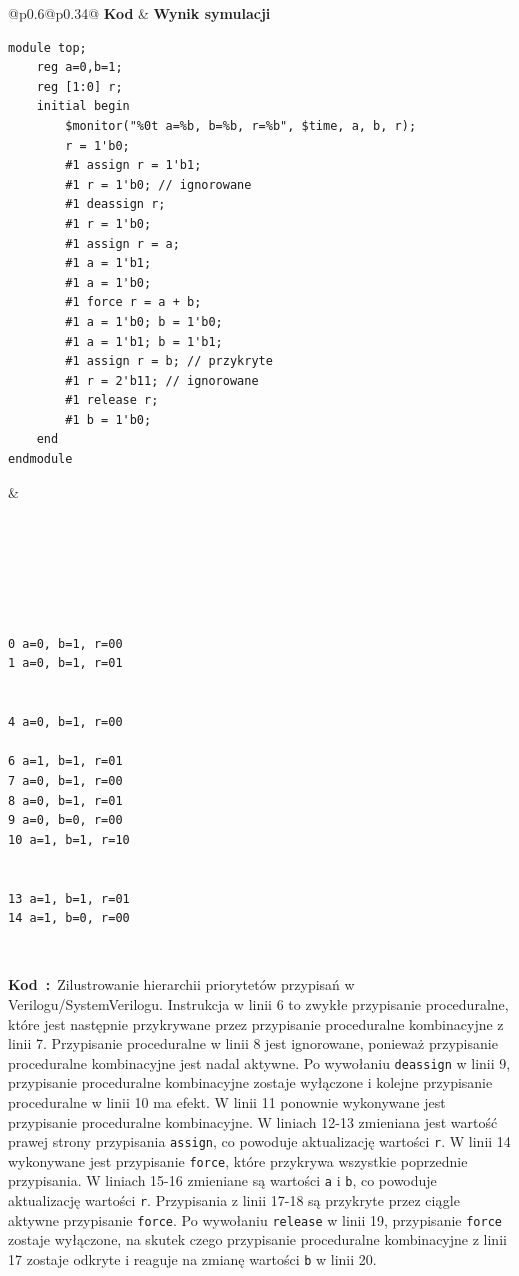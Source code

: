 \documentclass[shortabstract, inz]{iithesis}
\newcounter{kod}[chapter]
\renewcommand{\thekod}{\thechapter\arabic{kod}}
\newcommand{\codecaption}[2]{%
  \par\refstepcounter{kod}\label{#1}%
  \noindent\textbf{Kod~\thekod:}~#2\par
  \vspace*{1.0\baselineskip}%
}
\begin{document}
\noindent
\begin{tabular}{@{}p{0.6\linewidth}@{\hspace{1em}}p{0.34\linewidth}@{}}
\textbf{Kod} & \textbf{Wynik symulacji}\\ \hline

\begin{minipage}[t]{\linewidth}
\begin{verbatim}
module top;
    reg a=0,b=1;
    reg [1:0] r;
    initial begin
        $monitor("%0t a=%b, b=%b, r=%b", $time, a, b, r);
        r = 1'b0;
        #1 assign r = 1'b1;
        #1 r = 1'b0; // ignorowane
        #1 deassign r;
        #1 r = 1'b0;
        #1 assign r = a;
        #1 a = 1'b1;
        #1 a = 1'b0;
        #1 force r = a + b;
        #1 a = 1'b0; b = 1'b0;
        #1 a = 1'b1; b = 1'b1;
        #1 assign r = b; // przykryte
        #1 r = 2'b11; // ignorowane
        #1 release r;
        #1 b = 1'b0;
    end
endmodule
\end{verbatim}
\end{minipage}
&
\begin{minipage}[t]{\linewidth}
\begin{verbatim}






0 a=0, b=1, r=00
1 a=0, b=1, r=01


4 a=0, b=1, r=00

6 a=1, b=1, r=01
7 a=0, b=1, r=00
8 a=0, b=1, r=01
9 a=0, b=0, r=00
10 a=1, b=1, r=10


13 a=1, b=1, r=01
14 a=1, b=0, r=00
\end{verbatim}
\end{minipage}
\\
\end{tabular}
\codecaption{lst:hierarchy}{Zilustrowanie hierarchii priorytetów przypisań w Verilogu/SystemVerilogu. Instrukcja w linii 6 to zwykłe przypisanie proceduralne, które jest następnie przykrywane przez przypisanie proceduralne kombinacyjne z linii 7. Przypisanie proceduralne w linii 8 jest ignorowane, ponieważ przypisanie proceduralne kombinacyjne jest nadal aktywne. Po wywołaniu \texttt{deassign} w linii 9, przypisanie proceduralne kombinacyjne zostaje wyłączone i kolejne przypisanie proceduralne w linii 10 ma efekt. W linii 11 ponownie wykonywane jest przypisanie proceduralne kombinacyjne. W liniach 12-13 zmieniana jest wartość prawej strony przypisania \texttt{assign}, co powoduje aktualizację wartości \texttt{r}. W linii 14 wykonywane jest przypisanie \texttt{force}, które przykrywa wszystkie poprzednie przypisania. W liniach 15-16 zmieniane są wartości \texttt{a} i \texttt{b}, co powoduje aktualizację wartości \texttt{r}. Przypisania z linii 17-18 są przykryte przez ciągle aktywne przypisanie \texttt{force}. Po wywołaniu \texttt{release} w linii 19, przypisanie \texttt{force} zostaje wyłączone, na skutek czego przypisanie proceduralne kombinacyjne z linii 17 zostaje odkryte i reaguje na zmianę wartości \texttt{b} w linii 20.}
\end{document}
